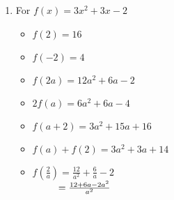 \documentclass{ximera}
\begin{document}
\begin{enumerate}
\begin{multicols}{3}
\begin{itemize}
\end{itemize}
\end{multicols}

\begin{multicols}{3}
\begin{itemize}

\item  $f \left( \frac{2}{a} \right) = \frac{8}{a^2} - 1$ \\
$\hphantom{f \left( \frac{2}{a} \right)} = \frac{8-a^2}{a^2}$

\vfill

\columnbreak

\item $\frac{f(a)}{2} =  \frac{2a^2-1}{2}$

\vfill

\columnbreak


\item  $f(a + h) = 2a^2+4ah+2h^2-1$

\end{itemize}
\end{multicols}



\item For $f(x) = 3x^2+3x-2$

\begin{multicols}{3}
\begin{itemize}

\item  $f(2) = 16$
\item  $f(-2) = 4$
\item  $f(2a) = 12a^2+6a-2$

\end{itemize}
\end{multicols}

\begin{multicols}{3}
\begin{itemize}

\item  $2 f(a) = 6a^2+6a-4$
\item $f(a+2) = 3a^2+15a+16$
\item \small $f(a) + f(2) = 3a^2+3a+14$ \normalsize

\end{itemize}
\end{multicols}

\begin{multicols}{3}
\begin{itemize}

\item  $f \left( \frac{2}{a} \right) = \frac{12}{a^2} + \frac{6}{a} - 2$ \\
$\hphantom{f \left( \frac{2}{a} \right)} = \frac{12+6a-2a^2}{a^2}$


\end{itemize}
\end{multicols}
\end{enumerate}
\end{document}
